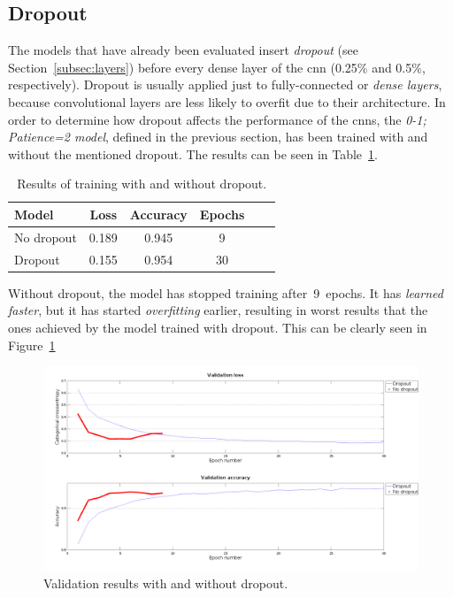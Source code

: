 \subsection{Dropout}
The models that have already been evaluated insert \emph{dropout} (see Section~\ref{subsec:layers}) before every dense layer of the \gls{cnn} (0.25\% and 0.5\%, respectively). Dropout is usually applied just to fully-connected or \emph{dense layers}, because convolutional layers are less likely to overfit due to their architecture. In order to determine how dropout affects the performance of the \glspl{cnn}, the \emph{\textit{0-1; Patience=2} model}, defined in the previous section, has been trained with and without the mentioned dropout. The results can be seen in Table~\ref{tbl:dropout}. 
\begin{table}
	\centering
	\begin{tabular}{l*{4}{c}r}
		\textbf{Model} & \textbf{Loss} & \textbf{Accuracy} & \textbf{Epochs} \\
		\hline
		No dropout & 0.189 & 0.945 & 9 \\
		Dropout & 0.155 & 0.954 & 30 \\
	\end{tabular}
	\caption{Results of training with and without dropout.}
	\label{tbl:dropout}
\end{table}

Without dropout, the model has stopped training after~9~epochs. It has \emph{learned faster}, but it has started \emph{overfitting} earlier, resulting in worst results that the ones achieved by the model trained with dropout. This can be clearly seen in Figure~\ref{fig:comp_dropout}
\begin{figure}
	\centering
	\includegraphics[width=1\linewidth, keepaspectratio]{figures/comp_dropout.png}
	\caption{Validation results with and without dropout.}
	\label{fig:comp_dropout}
\end{figure}

